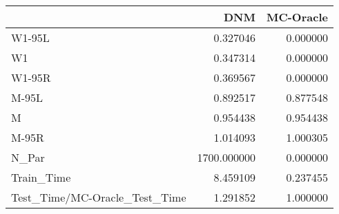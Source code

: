 \begin{tabular}{lrr}
\toprule
{} &          DNM &  MC-Oracle \\
\midrule
W1-95L                        &     0.327046 &   0.000000 \\
W1                            &     0.347314 &   0.000000 \\
W1-95R                        &     0.369567 &   0.000000 \\
M-95L                         &     0.892517 &   0.877548 \\
M                             &     0.954438 &   0.954438 \\
M-95R                         &     1.014093 &   1.000305 \\
N\_Par                         &  1700.000000 &   0.000000 \\
Train\_Time                    &     8.459109 &   0.237455 \\
Test\_Time/MC-Oracle\_Test\_Time &     1.291852 &   1.000000 \\
\bottomrule
\end{tabular}

